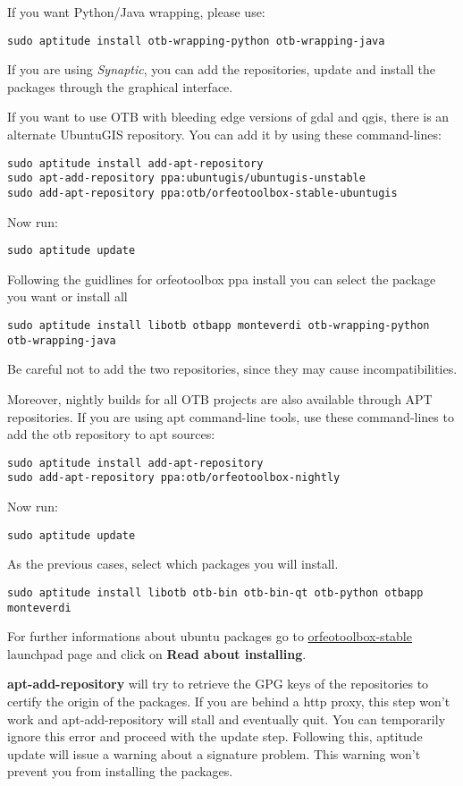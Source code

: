 If you want Python/Java wrapping, please use:
\begin{verbatim}
sudo aptitude install otb-wrapping-python otb-wrapping-java
\end{verbatim}

If you are using \emph{Synaptic}, you can add the repositories, update and install the packages through the
graphical interface.

If you want to use OTB with bleeding edge versions of gdal and qgis, there is an alternate UbuntuGIS repository.
You can add it by using these command-lines:
\begin{verbatim}
sudo aptitude install add-apt-repository 
sudo apt-add-repository ppa:ubuntugis/ubuntugis-unstable
sudo add-apt-repository ppa:otb/orfeotoolbox-stable-ubuntugis
\end{verbatim}
Now run:
\begin{verbatim}
sudo aptitude update
\end{verbatim}
Following the guidlines for orfeotoolbox ppa install you can select the package you want or install all
\begin{verbatim}
sudo aptitude install libotb otbapp monteverdi otb-wrapping-python otb-wrapping-java
\end{verbatim}

Be careful not to add the two repositories, since they may cause incompatibilities.

Moreover, nightly builds for all OTB projects are also available through APT repositories.
If you are using apt command-line tools, use these command-lines to add the otb repository to apt sources:
\begin{verbatim}
sudo aptitude install add-apt-repository 
sudo add-apt-repository ppa:otb/orfeotoolbox-nightly
\end{verbatim}
Now run:
\begin{verbatim}
sudo aptitude update
\end{verbatim}
As the previous cases, select which packages you will install.
\begin{verbatim}
sudo aptitude install libotb otb-bin otb-bin-qt otb-python otbapp monteverdi
\end{verbatim}

For further informations about ubuntu packages go to \href{https://launchpad.net/~otb/+archive/orfeotoolbox-stable}{orfeotoolbox-stable} launchpad page and click on \textbf{Read about installing}.

\textbf{apt-add-repository} will try to retrieve the GPG keys of the repositories to certify the origin of the packages. If you are behind a http proxy, this step won't work and apt-add-repository will stall and eventually quit. You can temporarily ignore this error and proceed with the update step. Following this, aptitude update will issue a warning about a signature problem. This warning won't prevent you from installing the packages.

